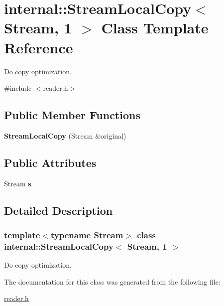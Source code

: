 \hypertarget{a02324}{}\section{internal\+:\+:Stream\+Local\+Copy$<$ Stream, 1 $>$ Class Template Reference}
\label{a02324}


Do copy optimization.  




{\ttfamily \#include $<$reader.\+h$>$}

\subsection*{Public Member Functions}
\begin{DoxyCompactItemize}
\item 
\mbox{\label{a02324_aba475fed3eecc9f77ff059fdb7fe2a32}} 
{\bfseries Stream\+Local\+Copy} (Stream \&original)
\end{DoxyCompactItemize}
\subsection*{Public Attributes}
\begin{DoxyCompactItemize}
\item 
\mbox{\label{a02324_a1d3e8ae8756325df25715d4ffb9c1b44}} 
Stream {\bfseries s}
\end{DoxyCompactItemize}


\subsection{Detailed Description}
\subsubsection*{template$<$typename Stream$>$\newline
class internal\+::\+Stream\+Local\+Copy$<$ Stream, 1 $>$}

Do copy optimization. 

The documentation for this class was generated from the following file\+:\begin{DoxyCompactItemize}
\item 
\hyperlink{a00563}{reader.\+h}\end{DoxyCompactItemize}
